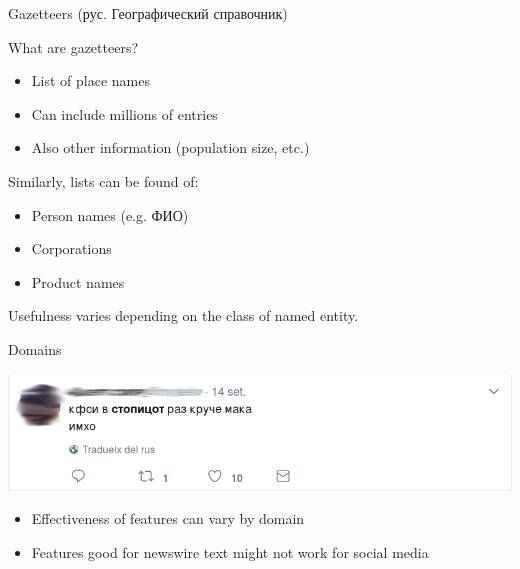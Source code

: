 \documentclass[10pt, compress]{beamer}
\begin{document}
\begin{frame}{Gazetteers (рус. Географический справочник)}

What are gazetteers?
\begin{itemize}
  \item List of place names 
  \item Can include millions of entries
  \item Also other information (population size, etc.)
\end{itemize}

Similarly, lists can be found of:
\begin{itemize}
  \item Person names (e.g. ФИО)
  \item Corporations
  \item Product names
\end{itemize}

Usefulness varies depending on the class of named entity.




\end{frame}

\begin{frame}{Domains}

\begin{center}
  \includegraphics[width=\textwidth]{graphics/kfe-mak.png}
\end{center}

\begin{itemize}
  \item Effectiveness of features can vary by domain
  \item Features good for newswire text might not work for social media
  
\end{itemize}

\end{frame}
\end{document}
